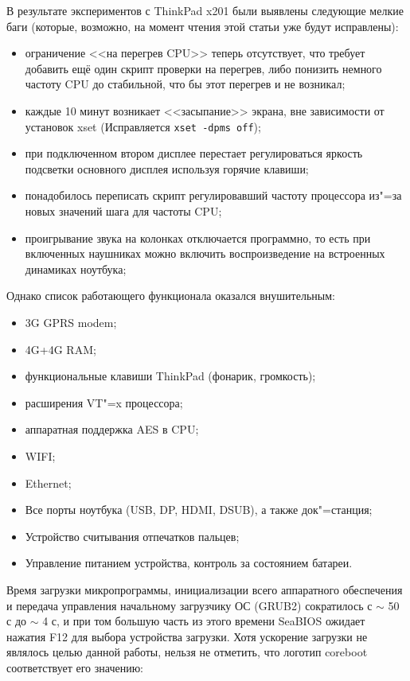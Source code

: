 \documentclass[10pt, a5paper]{article}
\begin{document}
В результате экспериментов с ThinkPad x201 были выявлены следующие мелкие баги (которые, возможно, на момент чтения этой статьи уже будут исправлены):

\begin{itemize}
  \item ограничение <<на перегрев CPU>> теперь отсутствует, что требует добавить ещё один скрипт проверки на перегрев, либо понизить немного частоту CPU до стабильной, что бы этот перегрев и не возникал;
  \item каждые 10 минут возникает <<засыпание>> экрана, вне зависимости от установок xset (Исправляется \verb!xset -dpms off!);
  \item при подключенном втором дисплее перестает регулироваться яркость подсветки основного дисплея используя горячие клавиши;
  \item понадобилось переписать скрипт регулировавший частоту процессора из"=за новых значений шага для частоты CPU;
  \item проигрывание звука на колонках отключается программно, то есть при включенных наушниках можно включить воспроизведение на встроенных динамиках ноутбука;
\end{itemize}

Однако список работающего функционала оказался внушительным:

\begin{itemize}
  \item 3G GPRS modem;
  \item 4G+4G RAM;
  \item функциональные клавиши ThinkPad (фонарик, громкость);
  \item расширения VT"=x процессора;
  \item аппаратная поддержка AES в CPU;
  \item WIFI;
  \item Ethernet;
  \item Все порты ноутбука (USB, DP, HDMI, DSUB), а также док"=станция;
  \item Устройство считывания отпечатков пальцев;
  \item Управление питанием устройства, контроль за состоянием батареи.
\end{itemize}

Время загрузки микропрограммы, инициализации всего аппаратного обеспечения и передача управления начальному загрузчику ОС (GRUB2) сократилось с $\sim$ 50 с до $\sim$ 4 с, и при том большую часть из этого времени SeaBIOS ожидает нажатия F12 для выбора устройства загрузки. Хотя ускорение загрузки не являлось целью данной работы, нельзя не отметить, что логотип coreboot соответствует его значению:
\end{document}
